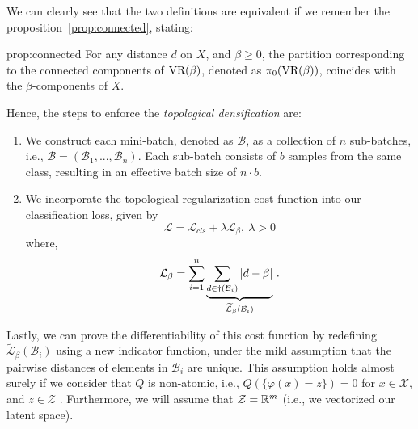 \documentclass[../main.tex]{subfiles}
\begin{document}
We can clearly see that the two definitions are equivalent if we remember the proposition~\ref{prop:connected}, stating:

\begin{repproposition}{prop:connected}
For any distance $d$ on $X$, and $\beta \geq 0$, the partition corresponding to the connected components of $\text{\rm VR}(\beta)$, denoted as $\pi_0(\text{\rm VR}(\beta))$, coincides with the $\beta$-components of $X$.
\end{repproposition}

Hence, the steps to enforce the \emph{topological densification} are:

\begin{enumerate}
    \item We construct each mini-batch, denoted as $\mathcal{B}$, as a collection of $n$ sub-batches, i.e., $\mathcal{B} = (\mathcal{B}_1, . . . , \mathcal{B}_n)$. Each sub-batch consists of $b$ samples from the same class, resulting in an effective batch size of $n \cdot b$.
    \item We incorporate the topological regularization cost function into our classification loss, given by
    \begin{equation}
    \label{eq:topo_reg}
    \mathcal{L} = \mathcal{L}_{cls} + \lambda\mathcal{L}_\beta,\ \lambda > 0 
    \end{equation}
    where,
    \begin{equation}
    \label{eq:topo_loss}
    \mathcal{L}_\beta = \sum_{i=1}^{n} \underbrace{\sum_{d \in \dag(\mathcal{B}_i)} \left\lvert d-\beta \right\rvert}_{\widetilde{\mathcal{L}}_\beta(\mathcal{B}_i)}\,.
    \end{equation}
\end{enumerate}

\begin{sloppypar}
Lastly, we can prove the differentiability of this cost function by redefining $\tilde{\mathcal{L}}_\beta(\mathcal{B}_i)$ using a new indicator function, under the mild assumption that the pairwise distances of elements in $\mathcal{B}_i$ are unique. This assumption holds almost surely if we consider that $Q$ is non-atomic, i.e., ${Q(\{\varphi(x) = z\})=0}$ for ${x \in \mathcal{X}}$, and $z \in \mathcal{Z}$ \cite{hofer_connectivity-optimized_2019}. Furthermore, we will assume that $\mathcal{Z}=\mathbb{R}^m$ (i.e., we vectorized our latent space).   
\end{sloppypar}
\end{document}
